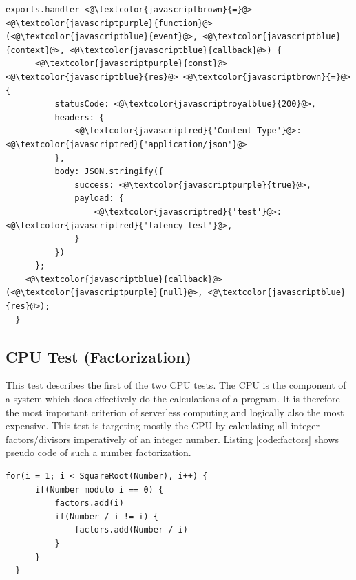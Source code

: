 \begin{minipage}{\linewidth}
\begin{lstlisting}[frame=single,caption={Latency test implementation on AWS in Node.js},label=code:latency,linewidth=.82\textwidth,xleftmargin=.18\textwidth]
  exports.handler <@\textcolor{javascriptbrown}{=}@> <@\textcolor{javascriptpurple}{function}@>(<@\textcolor{javascriptblue}{event}@>, <@\textcolor{javascriptblue}{context}@>, <@\textcolor{javascriptblue}{callback}@>) {
      <@\textcolor{javascriptpurple}{const}@> <@\textcolor{javascriptblue}{res}@> <@\textcolor{javascriptbrown}{=}@> {
          statusCode: <@\textcolor{javascriptroyalblue}{200}@>,
          headers: {
              <@\textcolor{javascriptred}{'Content-Type'}@>: <@\textcolor{javascriptred}{'application/json'}@>
          },
          body: JSON.stringify({
              success: <@\textcolor{javascriptpurple}{true}@>,
              payload: {
                  <@\textcolor{javascriptred}{'test'}@>: <@\textcolor{javascriptred}{'latency test'}@>,
              }
          })
      };
    <@\textcolor{javascriptblue}{callback}@>(<@\textcolor{javascriptpurple}{null}@>, <@\textcolor{javascriptblue}{res}@>);
  }
\end{lstlisting}
\end{minipage}

\subsection{CPU Test (Factorization)}
\label{sec:factors_test}
This test describes the first of the two \gls{CPU} tests. The \gls{CPU} is the component of a system which does effectively do the calculations of a program. It is therefore the most important criterion of serverless computing and logically also the most expensive. This test is targeting mostly the \gls{CPU} by calculating all integer factors/divisors imperatively of an integer number. Listing \ref{code:factors} shows pseudo code of such a number factorization.

\begin{minipage}{\linewidth}
\begin{lstlisting}[frame=single,caption={Factorization test pseudo code},label=code:factors,linewidth=.75\textwidth,xleftmargin=.25\textwidth]
  for(i = 1; i < SquareRoot(Number), i++) {
      if(Number modulo i == 0) {
          factors.add(i)
          if(Number / i != i) {
              factors.add(Number / i)
          }
      }
  }
\end{lstlisting}
\end{minipage}

